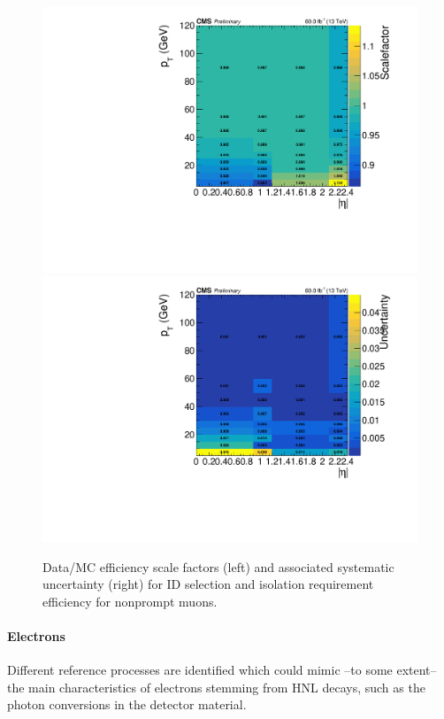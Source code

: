 \begin{figure}[h]
  \centering
 \includegraphics[width=.45\textwidth]{Figures/c6/efficiencies/muons/2018/idiso_nonprompt_sf_2018.pdf}
  \includegraphics[width=.45\textwidth]{Figures/c6/efficiencies/muons/2018/idiso_nonprompt_syst_2018.pdf}
  \caption{Data/MC efficiency scale factors (left) and associated
  systematic uncertainty (right) for ID selection and isolation
  requirement efficiency for nonprompt muons. \kirill}
  \label{fig:idiso_muon_nonprompt}
\end{figure}

\paragraph{Electrons}\label{sec:eff_disp_ele}

Different reference processes are identified which could mimic --to
some extent-- the main characteristics of \displ electrons 
stemming from HNL decays, such as the photon conversions in the
detector material.


